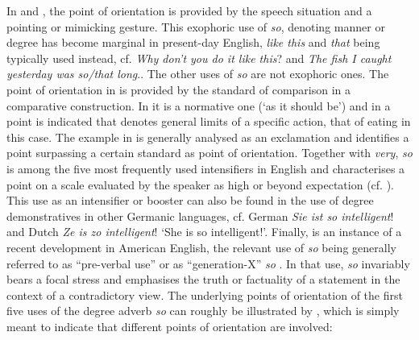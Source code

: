 \documentclass[output=paper,colorlinks,citecolor=brown]{langscibook}
\begin{document}
In  and , the point of orientation is provided by the speech situation and a pointing or mimicking gesture. This exophoric use of \textit{so}, denoting manner or degree has become marginal in present-day English, \textit{like this} and \textit{that} being typically used instead, cf. \textit{Why don’t you do it like this}? and \textit{The fish I caught yesterday was so/that long}.. The other uses of \textit{so} are not exophoric ones. The point of orientation in  is provided by the standard of comparison in a comparative construction. In  it is a normative one (‘as it should be’) and in  a point is indicated that denotes general limits of a specific action, that of eating in this case. The example in  is generally analysed as an exclamation and identifies a point surpassing a certain standard as point of orientation. Together with \textit{very}, \textit{so} is among the five most frequently used intensifiers in English and characterises a point on a scale evaluated by the speaker as high or beyond expectation (cf. \citealt{Bolinger1972}). This use as an intensifier or booster can also be found in the use of degree demonstratives in other Germanic languages, cf. German \textit{Sie ist so intelligent}! and Dutch \textit{Ze is zo intelligent}! ‘She is so intelligent!’. Finally,  is an instance of a recent development in American English, the relevant use of \textit{so} being generally referred to as “pre-verbal use” \citep{Boulonnais2005} or as “generation-X” \textit{so} \citep{Zwicky2007}. In that use, \textit{so} invariably bears a focal stress and emphasises the truth or factuality of a statement in the context of a contradictory view. The underlying points of orientation of the first five uses of the degree adverb \textit{so} can roughly be illustrated by , which is simply meant to indicate that different points of orientation are involved:

\end{document}
